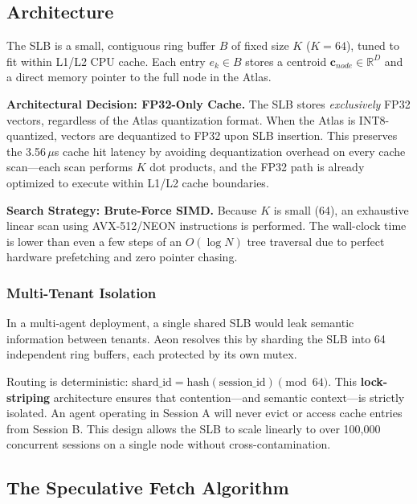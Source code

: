 \documentclass[10pt,twocolumn]{article}
\begin{document}
\subsection{Architecture}
The SLB is a small, contiguous ring buffer $B$ of fixed size $K$ ($K=64$), tuned to fit within L1/L2 CPU cache. Each entry $e_k \in B$ stores a centroid $\mathbf{c}_{node} \in \mathbb{R}^{D}$ and a direct memory pointer to the full node in the Atlas.

\textbf{Architectural Decision: FP32-Only Cache.} The SLB stores \emph{exclusively} FP32 vectors, regardless of the Atlas quantization format. When the Atlas is INT8-quantized, vectors are dequantized to FP32 upon SLB insertion. This preserves the 3.56\,$\mu$s cache hit latency by avoiding dequantization overhead on every cache scan---each scan performs $K$ dot products, and the FP32 path is already optimized to execute within L1/L2 cache boundaries.

\textbf{Search Strategy: Brute-Force SIMD.} Because $K$ is small (64), an exhaustive linear scan using AVX-512/NEON instructions is performed. The wall-clock time is lower than even a few steps of an $O(\log N)$ tree traversal due to perfect hardware prefetching and zero pointer chasing.

\subsubsection{Multi-Tenant Isolation}
\label{subsec:slb_multitenant}
In a multi-agent deployment, a single shared SLB would leak semantic information between tenants. Aeon resolves this by sharding the SLB into 64 independent ring buffers, each protected by its own mutex.

Routing is deterministic: $\text{shard\_id} = \text{hash}(\text{session\_id}) \pmod{64}$.
This \textbf{lock-striping} architecture ensures that contention—and semantic context—is strictly isolated. An agent operating in Session A will never evict or access cache entries from Session B. This design allows the SLB to scale linearly to over 100,000 concurrent sessions on a single node without cross-contamination.

\subsection{The Speculative Fetch Algorithm}
\end{document}
